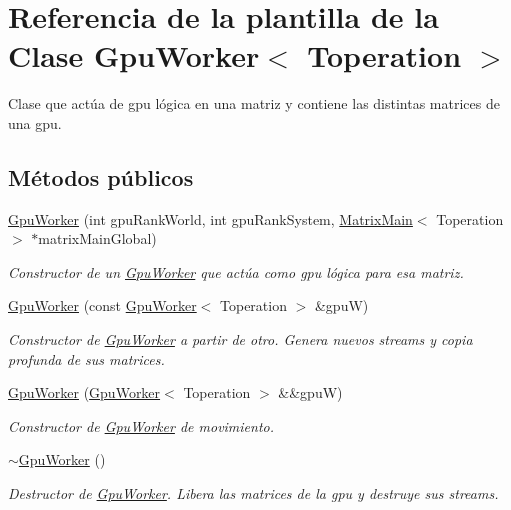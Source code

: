 \hypertarget{classGpuWorker}{}\section{Referencia de la plantilla de la Clase Gpu\+Worker$<$ Toperation $>$}
\label{classGpuWorker}


Clase que actúa de gpu lógica en una matriz y contiene las distintas matrices de una gpu.  


\subsection*{Métodos públicos}
\begin{DoxyCompactItemize}
\item 
\hyperlink{classGpuWorker_a8b9430babb610072c3437cf0fe323e83}{Gpu\+Worker} (int gpu\+Rank\+World, int gpu\+Rank\+System, \hyperlink{classMatrixMain}{Matrix\+Main}$<$ Toperation $>$ $\ast$matrix\+Main\+Global)
\begin{DoxyCompactList}\small\item\em Constructor de un \hyperlink{classGpuWorker}{Gpu\+Worker} que actúa como gpu lógica para esa matriz. \end{DoxyCompactList}\item 
\hyperlink{classGpuWorker_a27e31ab98324219abde4a2d9c2276e3b}{Gpu\+Worker} (const \hyperlink{classGpuWorker}{Gpu\+Worker}$<$ Toperation $>$ \&gpuW)
\begin{DoxyCompactList}\small\item\em Constructor de \hyperlink{classGpuWorker}{Gpu\+Worker} a partir de otro. Genera nuevos streams y copia profunda de sus matrices. \end{DoxyCompactList}\item 
\hyperlink{classGpuWorker_a044b63de42e1a606dd5a1342a6b8b2b7}{Gpu\+Worker} (\hyperlink{classGpuWorker}{Gpu\+Worker}$<$ Toperation $>$ \&\&gpuW)
\begin{DoxyCompactList}\small\item\em Constructor de \hyperlink{classGpuWorker}{Gpu\+Worker} de movimiento. \end{DoxyCompactList}\item 
\mbox{\label{classGpuWorker_ac1f1bec6fac19b50edef348f7d7d0894}} 
\hyperlink{classGpuWorker_ac1f1bec6fac19b50edef348f7d7d0894}{$\sim$\+Gpu\+Worker} ()
\begin{DoxyCompactList}\small\item\em Destructor de \hyperlink{classGpuWorker}{Gpu\+Worker}. Libera las matrices de la gpu y destruye sus streams. \end{DoxyCompactList}\item 

\end{DoxyCompactItemize}
